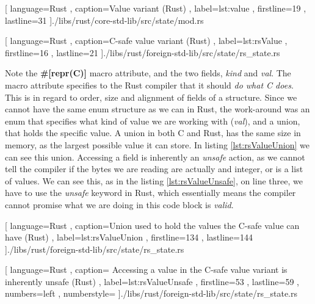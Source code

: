 \begin{code}[H]
  
    [ language=Rust
    , caption={Value variant (Rust)}
    , label=lst:value
    , firstline=19
    , lastline=31
    ]{./libs/rust/core-std-lib/src/state/mod.rs}
\end{code}

\begin{code}[H]
  
    [ language=Rust
    , caption={C-safe value variant (Rust)}
    , label=lst:rsValue
    , firstline=16
    , lastline=21
    ]{./libs/rust/foreign-std-lib/src/state/rs\_state.rs}
\end{code}

Note the \textbf{\#[repr(C)]} macro attribute, and the two fields,
\textit{kind} and \textit{val}. The macro attribute specifies to the Rust
compiler that it should \textit{do what C does}. This is in regard to order,
size and alignment of fields of a structure. Since we cannot have the same enum
structure as we can in Rust, the work-around was an enum that specifies what
kind of value we are working with (\textit{val}), and a union, that holds the
specific value. A union in both C and Rust, has the same size in memory, as the
largest possible value it can store. In listing \ref{lst:rsValueUnion} we can
see this union. Accessing a field is inherently an \textit{unsafe} action, as we
cannot tell the compiler if the bytes we are reading are actually and integer,
or is a list of values. We can see this, as in the listing
\ref{lst:rsValueUnsafe}, on line three, we have to use the \textit{unsafe}
keyword in Rust, which essentially means the compiler cannot promise what we are
doing in this code block is \textit{valid}.

\begin{code}
  
    [ language=Rust
    , caption={Union used to hold the values the C-safe value can have (Rust)}
    , label=lst:rsValueUnion
    , firstline=134
    , lastline=144
    ]{./libs/rust/foreign-std-lib/src/state/rs\_state.rs}
\end{code}

\begin{code}
  
    [ language=Rust
    , caption={
      Accessing a value in the C-safe value variant is inherently unsafe (Rust)
    }
    , label=lst:rsValueUnsafe
    , firstline=53
    , lastline=59
    , numbers=left
    , numberstyle=\tiny\color{gray}
    ]{./libs/rust/foreign-std-lib/src/state/rs\_state.rs}
\end{code}

